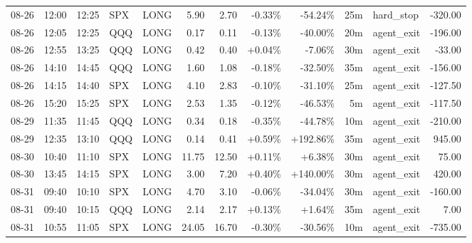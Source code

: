 \documentclass[11pt,a4paper,twoside]{article}
\begin{document}
\begin{center}
\begin{longtable}{>{\color{txtmain}}l l l l l r r r r r >{\color{txtmain}}l r}
08-26 & 12:00 & 12:25 & SPX & LONG & 5.90 & 2.70 & \textcolor{lossred}{-0.33\%} & \textcolor{lossred}{-54.24\%} & 25m & hard\_stop & \textcolor{lossred}{-320.00} \\
08-26 & 12:05 & 12:25 & QQQ & LONG & 0.17 & 0.11 & \textcolor{lossred}{-0.13\%} & \textcolor{lossred}{-40.00\%} & 20m & agent\_exit & \textcolor{lossred}{-196.00} \\
08-26 & 12:55 & 13:25 & QQQ & LONG & 0.42 & 0.40 & \textcolor{wingreen}{+0.04\%} & \textcolor{lossred}{-7.06\%} & 30m & agent\_exit & \textcolor{lossred}{-33.00} \\
08-26 & 14:10 & 14:45 & QQQ & LONG & 1.60 & 1.08 & \textcolor{lossred}{-0.18\%} & \textcolor{lossred}{-32.50\%} & 35m & agent\_exit & \textcolor{lossred}{-156.00} \\
08-26 & 14:15 & 14:40 & SPX & LONG & 4.10 & 2.83 & \textcolor{lossred}{-0.10\%} & \textcolor{lossred}{-31.10\%} & 25m & agent\_exit & \textcolor{lossred}{-127.50} \\
08-26 & 15:20 & 15:25 & SPX & LONG & 2.53 & 1.35 & \textcolor{lossred}{-0.12\%} & \textcolor{lossred}{-46.53\%} & 5m & agent\_exit & \textcolor{lossred}{-117.50} \\
08-29 & 11:35 & 11:45 & QQQ & LONG & 0.34 & 0.18 & \textcolor{lossred}{-0.35\%} & \textcolor{lossred}{-44.78\%} & 10m & agent\_exit & \textcolor{lossred}{-210.00} \\
08-29 & 12:35 & 13:10 & QQQ & LONG & 0.14 & 0.41 & \textcolor{wingreen}{+0.59\%} & \textcolor{wingreen}{+192.86\%} & 35m & agent\_exit & \textcolor{wingreen}{945.00} \\
08-30 & 10:40 & 11:10 & SPX & LONG & 11.75 & 12.50 & \textcolor{wingreen}{+0.11\%} & \textcolor{wingreen}{+6.38\%} & 30m & agent\_exit & \textcolor{wingreen}{75.00} \\
08-30 & 13:45 & 14:15 & SPX & LONG & 3.00 & 7.20 & \textcolor{wingreen}{+0.40\%} & \textcolor{wingreen}{+140.00\%} & 30m & agent\_exit & \textcolor{wingreen}{420.00} \\
08-31 & 09:40 & 10:10 & SPX & LONG & 4.70 & 3.10 & \textcolor{lossred}{-0.06\%} & \textcolor{lossred}{-34.04\%} & 30m & agent\_exit & \textcolor{lossred}{-160.00} \\
08-31 & 09:40 & 10:15 & QQQ & LONG & 2.14 & 2.17 & \textcolor{wingreen}{+0.13\%} & \textcolor{wingreen}{+1.64\%} & 35m & agent\_exit & \textcolor{wingreen}{7.00} \\
08-31 & 10:55 & 11:05 & SPX & LONG & 24.05 & 16.70 & \textcolor{lossred}{-0.30\%} & \textcolor{lossred}{-30.56\%} & 10m & agent\_exit & \textcolor{lossred}{-735.00} \\

\end{longtable}
\end{center}
\end{document}
